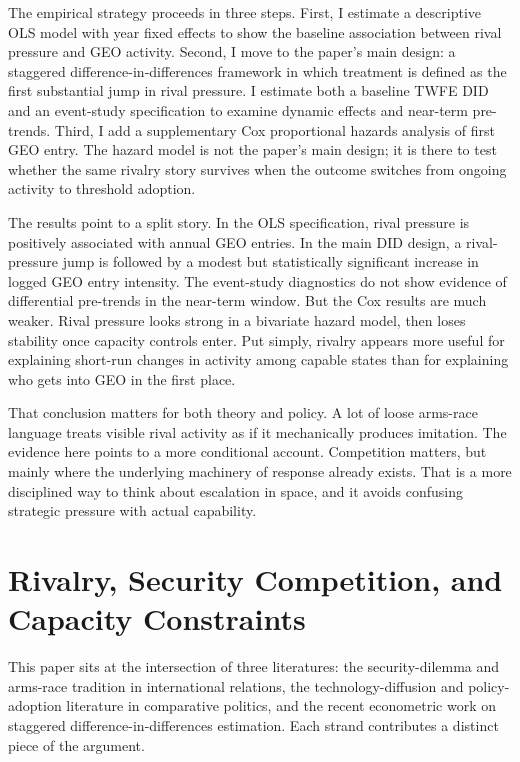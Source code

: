 \documentclass[11pt]{article}
\begin{document}
The empirical strategy proceeds in three steps. First, I estimate a descriptive OLS model with year fixed effects to show the baseline association between rival pressure and GEO activity. Second, I move to the paper's main design: a staggered difference-in-differences framework in which treatment is defined as the first substantial jump in rival pressure. I estimate both a baseline TWFE DID and an event-study specification to examine dynamic effects and near-term pre-trends. Third, I add a supplementary Cox proportional hazards analysis of first GEO entry. The hazard model is not the paper's main design; it is there to test whether the same rivalry story survives when the outcome switches from ongoing activity to threshold adoption.

The results point to a split story. In the OLS specification, rival pressure is positively associated with annual GEO entries. In the main DID design, a rival-pressure jump is followed by a modest but statistically significant increase in logged GEO entry intensity. The event-study diagnostics do not show evidence of differential pre-trends in the near-term window. But the Cox results are much weaker. Rival pressure looks strong in a bivariate hazard model, then loses stability once capacity controls enter. Put simply, rivalry appears more useful for explaining short-run changes in activity among capable states than for explaining who gets into GEO in the first place.

That conclusion matters for both theory and policy. A lot of loose arms-race language treats visible rival activity as if it mechanically produces imitation. The evidence here points to a more conditional account. Competition matters, but mainly where the underlying machinery of response already exists. That is a more disciplined way to think about escalation in space, and it avoids confusing strategic pressure with actual capability.

\section{Rivalry, Security Competition, and Capacity Constraints}

This paper sits at the intersection of three literatures: the security-dilemma and arms-race tradition in international relations, the technology-diffusion and policy-adoption literature in comparative politics, and the recent econometric work on staggered difference-in-differences estimation. Each strand contributes a distinct piece of the argument.
\end{document}
